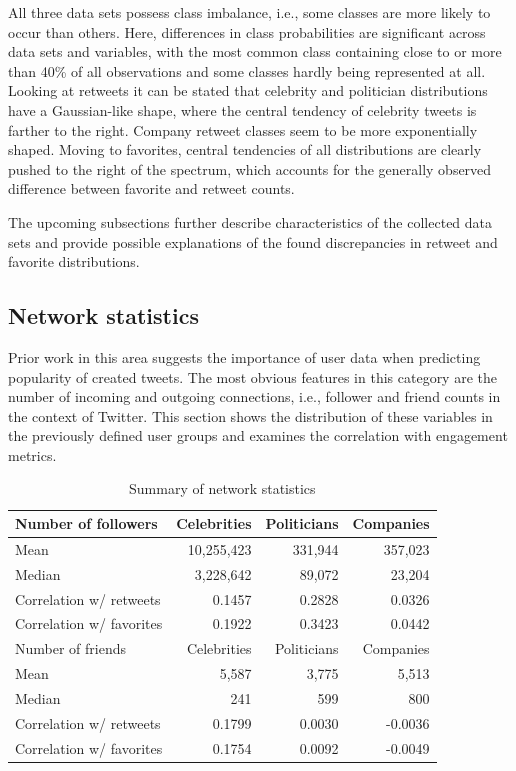 All three data sets possess class imbalance, i.e., some classes are more likely
to occur than others.
Here, differences in class probabilities are significant across data sets
and variables, with the most common class
containing close to or more than 40\% of all observations and some classes
hardly being represented at all.
Looking at retweets it can be stated that celebrity and politician distributions
have a Gaussian-like shape, where the central tendency of celebrity tweets is
farther to the right.
Company retweet classes seem to be more exponentially shaped.
Moving to favorites, central tendencies of all distributions are clearly pushed to the right of the
spectrum, which accounts for the generally observed difference between favorite
and retweet counts.

The upcoming subsections further describe characteristics of the collected
data sets and provide possible explanations of the found discrepancies in
retweet and favorite distributions.

\subsection{Network statistics}
\label{sec:network_stats}

Prior work in this area suggests the importance of user data when predicting
popularity of created tweets.
The most obvious features in this category are the number of incoming and outgoing
connections, i.e., follower and friend counts in the context of Twitter.
This section shows the distribution of these variables in the previously
defined user groups and examines the correlation with engagement metrics.

\begin{table}
\centering
\begin{tabular}{lrrr}
\toprule
Number of followers & Celebrities & Politicians & Companies \\
\midrule
Mean & 10,255,423 & 331,944 & 357,023 \\
Median & 3,228,642 & 89,072 & 23,204 \\
Correlation w/ retweets & 0.1457 & 0.2828 & 0.0326 \\
Correlation w/ favorites & 0.1922 & 0.3423 & 0.0442 \\
\midrule
Number of friends & Celebrities & Politicians & Companies \\
\midrule
Mean & 5,587 & 3,775 & 5,513 \\
Median & 241 & 599 & 800 \\
Correlation w/ retweets & 0.1799 & 0.0030 & -0.0036 \\
Correlation w/ favorites & 0.1754 & 0.0092 & -0.0049 \\
\bottomrule
\end{tabular}
\caption{Summary of network statistics}
\label{tab:network_summary}
\end{table}

